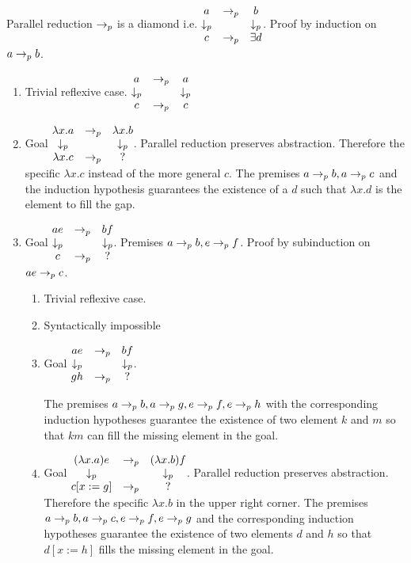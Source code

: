 \begin{theorem}
  Parallel reduction $\to_{p}$ is a diamond i.e.
  $\begin{matrix}
    a & \to_{p} & b \\
    \downarrow_p & & \downarrow_p \\
    c & \to_{p} & \exists d
  \end{matrix}
  $.
  Proof by induction on $a \to_{p} b$.
  \begin{enumerate}
  \item
    Trivial reflexive case.
    $\begin{matrix} a & \to_p & a \\ \downarrow_p & & \downarrow_p \\ c & \to_p & c \end{matrix}
    $

  \item Goal
    $\begin{matrix} \lambda x.a & \to_p & \lambda x.b \\ \downarrow_p & & \downarrow_p \\ \lambda x.c & \to_p & ? \end{matrix}$.
    Parallel reduction preserves abstraction. Therefore the specific
    $\lambda x.c$ instead of the more general $c$.
    The premises $a\to_{p} b, a \to_{p} c$ and the induction hypothesis
    guarantees the existence of a $d$ such that $\lambda x.d$ is the element
    to fill the gap.

  \item
    Goal $\begin{matrix} a e & \to_p & b f \\ \downarrow_p & & \downarrow_p \\ c & \to_p & ? \end{matrix}$. Premises $a \to_{p} b, e \to_{p} f$.
    Proof by subinduction on $a e \to_{p} c$.

    \begin{enumerate}
    \item Trivial reflexive case.
    \item Syntactically impossible
    \item
      Goal $\begin{matrix} a e & \to_p & b f \\ \downarrow_p & & \downarrow_p \\ g h & \to_p & ? \end{matrix}$.

      The premises $a \to_{p} b, a \to_{p} g, e \to_{p} f, e \to_{p} h$
      with the corresponding induction hypotheses guarantee the existence of
      two element $k$ and $m$ so that $ k m$ can fill the missing element in
      the goal.

    \item
      Goal $\begin{matrix} (\lambda x.a) e & \to_p & (\lambda x.b) f \\ \downarrow_p & & \downarrow_p \\ c[x:=g] & \to_p & ? \end{matrix}$.
      Parallel reduction preserves abstraction. Therefore the specific
      $\lambda x.b$ in the upper right corner.
      The premises $a \to_{p} b, a \to_{p} c, e \to_{p} f, e \to_{p} g$
      and the corresponding induction hypotheses guarantee the existence of
      two elements $d$ and $h$ so that $d[x:=h]$ fills the missing element
      in the goal.
    \end{enumerate}


\end{enumerate}
\end{theorem}

